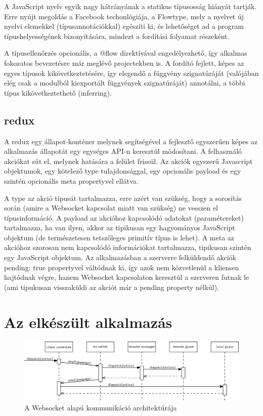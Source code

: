 \documentclass[11pt]{article}
\begin{document}
A JavaScript nyelv egyik nagy hátrányának a statikus típusosság hiányát tartják.
Erre nyújt megoldás a Facebook techonlógiája, a Flowtype, mely a nyelvet
új nyelvi elemekkel (típusannotációkkal) egészíti ki, és lehetőséget ad a program
típushelyességének bizonyítására, mindezt a fordítási folyamat részeként.

A típusellenőrzés opcionális, a @flow direktívával engedélyezhető, így alkalmas
fokozatos bevezetésre már meglévő projectekben is.
A fordító fejlett, képes az egyes típusok kikövetkeztetésére, így elegendő
a függvény szignatúráját (valójában elég csak a modulból kiexportált függvények
szignatúráját) annotálni, a többi típus kikövetkeztethető (inferring).

\subsection{redux}

A redux egy állapot-konténer melynek segítségével a fejlesztő egyszerűen képes
az alkalmazás állapotát egy egységes API-n keresztül módosítani.
A felhasználó akciókat süt el, melynek hatására a felület frissül.
Az akciók egyszerű Javascript objektumok, egy kötelező type tulajdonsággal,
egy opcionális payload és egy szintén opcionális meta propertyvel ellátva.

A type az akció típusát tartalmazza, erre azért van szükség, hogy a sorosítás
során (amire a Websocket kapcsolat miatt van szükség) ne vesszen el
típusinformáció.
A payload az akcióhoz kapcsolódó adatokat (paramétereket) tartalmazza,
ha van ilyen, akkor az tipikusan egy hagyományos JavaScript objektum (de
természetesen tetszőleges primitív típus is lehet).
A meta az akcióhoz szorosan nem kapcsolódó információkat tartalmazza, tipikusan
szintén egy JavaScript objektum.
Az alkalmazásban a szerverre felküldendő akciók pending: true propertyvel
váltódnak ki, így azok nem közvetlenül a kliensen hajtódnak végre, hanem
Websocket kapcsolaton keresztül a szerveren futnak le (ami tipukusan visszaküldi az
akciót már a pending property nélkül).

\section{Az elkészült alkalmazás}

\begin{figure}[h!]
  \centering
  \includegraphics[width=\textwidth]{figures/ws}
  \caption{A Websocket alapú kommunikáció architektúrája}
  \label{fig:ws-arch}
\end{figure}
\end{document}
